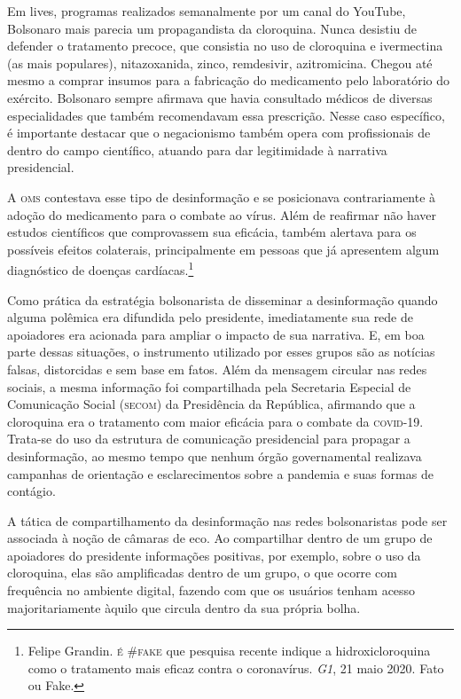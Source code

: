 Em lives, programas realizados semanalmente por um canal do YouTube,
Bolsonaro mais parecia um propagandista da cloroquina. Nunca desistiu de
defender o tratamento precoce, que consistia no uso de cloroquina e
ivermectina (as mais populares), nitazoxanida, zinco,
remdesivir, azitromicina. Chegou até mesmo a comprar insumos para a
fabricação do medicamento pelo laboratório do exército. Bolsonaro sempre
afirmava que havia consultado médicos de diversas especialidades que
também recomendavam essa prescrição. Nesse caso específico, é importante
destacar que o negacionismo também opera com profissionais de dentro do
campo científico, atuando para dar legitimidade à narrativa
presidencial.

A \textsc{oms} contestava esse tipo de desinformação e se posicionava
contrariamente à adoção do medicamento para o combate ao vírus. Além de
reafirmar não haver estudos científicos que comprovassem sua eficácia,
também alertava para os possíveis efeitos colaterais, principalmente em
pessoas que já apresentem algum diagnóstico de doenças cardíacas.\footnote{Felipe Grandin. \textsc{é \#fake} que pesquisa recente indique a
hidroxicloroquina como o tratamento mais eficaz contra o coronavírus. \textit{G1}, 21 maio 2020. Fato ou Fake.}

Como prática da estratégia bolsonarista de disseminar a desinformação
quando alguma polêmica era difundida pelo presidente, imediatamente sua
rede de apoiadores era acionada para ampliar o impacto de sua narrativa.
E, em boa parte dessas situações, o instrumento utilizado por esses
grupos são as notícias falsas, distorcidas e sem base em fatos. Além da
mensagem circular nas redes sociais, a mesma informação foi compartilhada
pela Secretaria Especial de Comunicação Social (\textsc{secom}) da Presidência da
República, afirmando que a cloroquina era o tratamento com maior
eficácia para o combate da \textsc{covid-19}. Trata-se do uso da estrutura de
comunicação presidencial para propagar a desinformação, ao mesmo tempo que
nenhum órgão governamental realizava campanhas de orientação e
esclarecimentos sobre a pandemia e suas formas de contágio.

A tática de compartilhamento da desinformação nas redes bolsonaristas
pode ser associada à noção de câmaras de eco. Ao compartilhar dentro de
um grupo de apoiadores do presidente informações positivas, por exemplo,
sobre o uso da cloroquina, elas são amplificadas dentro de um grupo, o
que ocorre com frequência no ambiente digital, fazendo com que os
usuários tenham acesso majoritariamente àquilo que circula dentro da sua
própria bolha.

